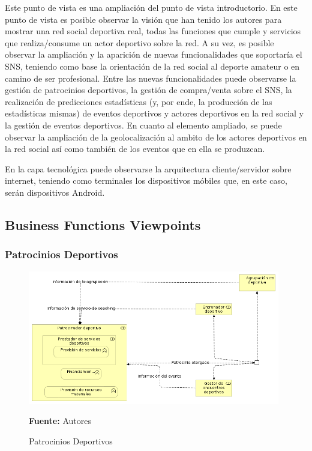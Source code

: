 Este punto de vista es una ampliación del punto de vista introductorio. En este punto de vista es posible observar la visión que han tenido los autores para mostrar una red social deportiva real, todas las funciones que cumple y servicios que realiza/consume un actor deportivo sobre la red. A su vez, es posible observar la ampliación y la aparición de nuevas funcionalidades que soportaría el SNS, teniendo como base la orientación de la red social al deporte amateur o en camino de ser profesional. Entre las nuevas funcionalidades puede observarse la gestión de patrocinios deportivos, la gestión de compra/venta sobre el SNS, la realización de predicciones estadísticas (y, por ende, la producción de las estadísticas mismas) de eventos deportivos y actores deportivos en la red social y la gestión de eventos deportivos. En cuanto al elemento ampliado, se puede observar la ampliación de la geolocalización al ambito de los actores deportivos en la red social así como también de los eventos que en ella se produzcan.

En la capa tecnológica puede observarse la arquitectura cliente/servidor sobre internet, teniendo como terminales los dispositivos móbiles que, en este caso, serán dispositivos Android.

\subsection{Business Functions Viewpoints}

\subsubsection{Patrocinios Deportivos}

\begin{figure}[!htb]
  \begin{center}
    \includegraphics[width=11cm]{./imagenes/business_functions/patrociniosdeportivos.png}
    \caption{Patrocinios Deportivos}
    \label{fig:bf_patrocinios_deportivos}
    \textbf{Fuente:}  Autores
  \end{center}
\end{figure}

